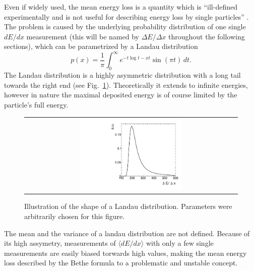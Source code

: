 Even if widely used, the mean energy loss is a quantity which is ``ill-defined experimentally and is not useful for describing energy loss by single particles'' \cite{bib:PDG_2014}.
The problem is caused by the underlying probability distribution of one single $dE/dx$ measurement (this will be named by $\Delta E/ \Delta x $ throughout the following sections), which can be parametrized by a Landau distribution \cite{bib:Landau_1944}
\begin{equation*}
p(x) = \frac{1}{\pi} \int_0^\infty\! e^{-t \log t - x t} \sin(\pi t)\, dt.
\end{equation*}
The Landau distribution is a highly asymmetric distribution with a long tail towards the right end (see Fig.~\ref{fig:landau}).
Theoretically it extends to infinite energies, however in nature the maximal deposited energy is of course limited by the particle's full energy.
\begin{figure}[!t]
  \centering 
  \begin{tabular}{c}
  \includegraphics[width=0.49\textwidth]{figures/analysis/Landau.pdf}
  \end{tabular}
  \caption{Illustration of the shape of a Landau distribution. Parameters were arbitrarily chosen for this figure.} 
  \label{fig:landau}
\end{figure}
The mean and the variance of a landau distribution are not defined.
Because of its high assymetry, measurements of $\langle dE/dx \rangle$ with only a few single measurements are easily biased torwards high values, making the mean energy loss described by the Bethe formula to a problematic and unstable concept. 



